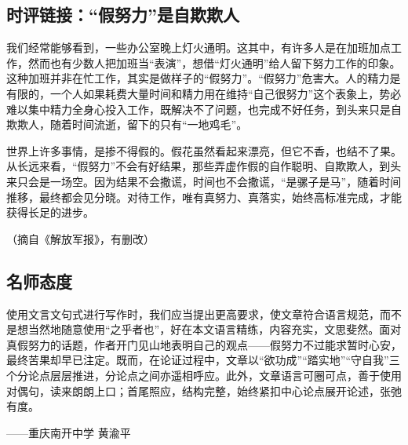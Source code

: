 \subsection*{时评链接：“假努力”是自欺欺人}

我们经常能够看到，一些办公室晚上灯火通明。这其中，有许多人是在加班加点工作，然而也有少数人把加班当“表演”，想借“灯火通明”给人留下努力工作的印象。这种加班并非在忙工作，其实是做样子的“假努力”。“假努力”危害大。人的精力是有限的，一个人如果耗费大量时间和精力用在维持“自己很努力”这个表象上，势必难以集中精力全身心投入工作，既解决不了问题，也完成不好任务，到头来只是自欺欺人，随着时间流逝，留下的只有“一地鸡毛”。

世界上许多事情，是掺不得假的。假花虽然看起来漂亮，但它不香，也结不了果。从长远来看，“假努力”不会有好结果，那些弄虚作假的自作聪明、自欺欺人，到头来只会是一场空。因为结果不会撒谎，时间也不会撒谎，“是骡子是马”，随着时间推移，最终都会见分晓。对待工作，唯有真努力、真落实，始终高标准完成，才能获得长足的进步。

（摘自《解放军报》，有删改）

\subsection*{名师态度}

使用文言文句式进行写作时，我们应当提出更高要求，使文章符合语言规范，而不是想当然地随意使用“之乎者也”，好在本文语言精练，内容充实，文思斐然。面对真假努力的话题，作者开门见山地表明自己的观点——假努力不过能求暂时心安，最终苦果却早已注定。既而，在论证过程中，文章以“欲功成”“踏实地”“守自我”三个分论点层层推进，分论点之间亦遥相呼应。此外，文章语言可圈可点，善于使用对偶句，读来朗朗上口；首尾照应，结构完整，始终紧扣中心论点展开论述，张弛有度。

——重庆南开中学 黄渝平
